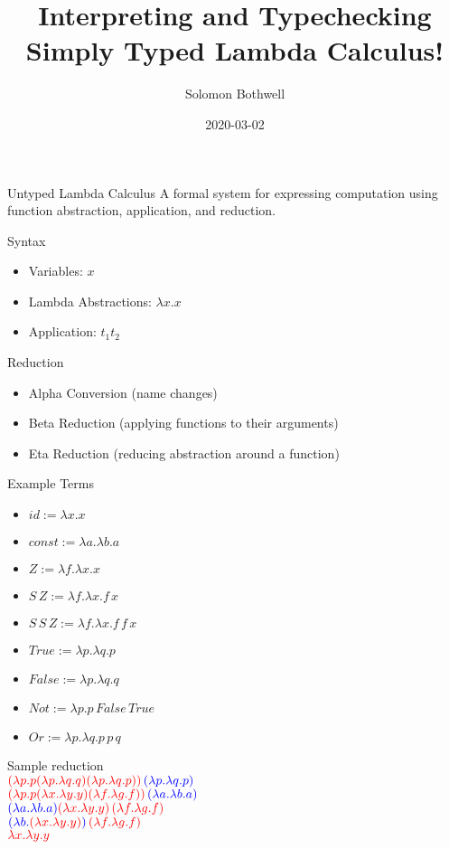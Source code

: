 \documentclass[presentation]{beamer}
\author{Solomon Bothwell}
\date{2020-03-02}
\title{Interpreting and Typechecking Simply Typed Lambda Calculus!}
\begin{document}
\maketitle

\begin{frame}[label={sec:orgf05eaee}]{Untyped Lambda Calculus}
A formal system for expressing computation using function abstraction,
application, and reduction.
\end{frame}
\begin{frame}[label={sec:org2d78ad9}]{Syntax}
\begin{itemize}
\item Variables: \(x\)
\item Lambda Abstractions: \(\lambda x.x\)
\item Application: \(t_1 t_2\)
\end{itemize}
\end{frame}
\begin{frame}[label={sec:org51d1a4a}]{Reduction}
\begin{itemize}
\item Alpha Conversion (name changes)
\item Beta Reduction (applying functions to their arguments)
\item Eta Reduction (reducing abstraction around a function)
\end{itemize}
\end{frame}
\begin{frame}[label={sec:org30769f8}]{Example Terms}
\begin{itemize}
\item \(id := \lambda x.x\)
\item \(const := \lambda a.\lambda b.a\)
\item \(Z := \lambda f.\lambda x.x\)
\item \(S\,Z := \lambda f.\lambda x.f\,x\)
\item \(S\,S\,Z := \lambda f.\lambda x.f\,f\,x\)
\item \(True := \lambda p.\lambda q.p\)
\item \(False := \lambda p.\lambda q.q\)
\item \(Not := \lambda p.p\,False\,True\)
\item \(Or := \lambda p.\lambda q.p\,p\,q\)
\end{itemize}
\end{frame}
\begin{frame}[label={sec:orgcc8087b}]{Sample reduction}
 \\
\(\color{red}(\lambda p.p (\lambda p.\lambda q.q) (\lambda p.\lambda q.p))\,\color{blue}(\lambda p.\lambda q.p)\) \\
\(\color{red}(\lambda p.p (\lambda x.\lambda y.y) (\lambda f.\lambda g.f))\,\color{blue}(\lambda a.\lambda b.a)\) \\
\(\color{blue}(\lambda a.\lambda b.a) \color{red}(\lambda x.\lambda y.y)\,(\lambda f.\lambda g.f)\) \\
\(\color{blue}(\lambda b.\color{red}(\lambda x.\lambda y.y)\color{blue})\,\color{red}(\lambda f.\lambda g.f)\) \\
\(\color{red}\lambda x.\lambda y.y\)
\end{frame}
\end{document}
